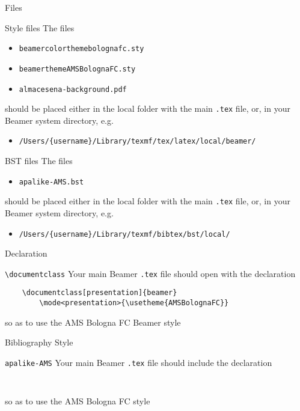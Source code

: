 \documentclass[presentation]{beamer}\mode<presentation>{\usetheme{AMSBolognaFC}}
\begin{document}
\begin{frame}[c,allowframebreaks]{Files}
%
\begin{block}{Style files}
The files
\begin{itemize}
	\item \texttt{beamercolorthemebolognafc.sty}
	\item \texttt{beamerthemeAMSBolognaFC.sty}
	\item \texttt{almacesena-background.pdf}
\end{itemize}
should be placed either in the local folder with the main \texttt{.tex} file, or, in your Beamer system directory, e.g.
\begin{itemize}
	\item \texttt{/Users/\{username\}/Library/texmf/tex/latex/local/beamer/}
\end{itemize}
\end{block}
%
\begin{block}{BST files}
The files
\begin{itemize}
	\item \texttt{apalike-AMS.bst}
\end{itemize}
should be placed either in the local folder with the main \texttt{.tex} file, or, in your Beamer system directory, e.g.
\begin{itemize}
	\item \texttt{/Users/\{username\}/Library/texmf/bibtex/bst/local/}
\end{itemize}
\end{block}
%
\end{frame}

\begin{frame}[c,fragile]{Declaration}
%
\begin{block}{\texttt{\textbackslash{}documentclass}}
Your main Beamer \texttt{.tex} file should open with the declaration
%
\begin{verbatim}
    \documentclass[presentation]{beamer}
        \mode<presentation>{\usetheme{AMSBolognaFC}}
\end{verbatim}
%
so as to use the AMS Bologna FC Beamer style 
\end{block}
%
\end{frame}

\begin{frame}[c,fragile]{Bibliography Style}
%
\begin{block}{\texttt{apalike-AMS}}
Your main Beamer \texttt{.tex} file should include the declaration
\begin{verbatim}
    
\end{verbatim}	
so as to use the AMS Bologna FC \BibTeX{} style 
\end{block}
%
\end{frame}
\end{document}
